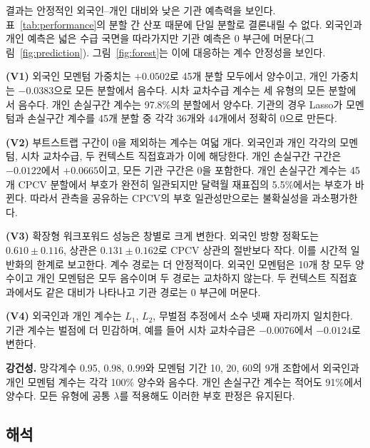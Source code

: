 결과는 안정적인 외국인--개인 대비와 낮은 기관 예측력을 보인다. 표~\ref{tab:performance}의
분할 간 산포 때문에 단일 분할로 결론내릴 수 없다. 외국인과 개인 예측은 넓은 수급
국면을 따라가지만 기관 예측은 0 부근에 머문다(그림~\ref{fig:prediction}).
그림~\ref{fig:forest}는 이에 대응하는 계수 안정성을 보인다.

\textbf{(V1)} 외국인 모멘텀 가중치는 $+0.0502$로 45개 분할 모두에서 양수이고, 개인
가중치는 $-0.0383$으로 모든 분할에서 음수다. 시차 교차수급 계수는 세 유형의 모든
분할에서 음수다. 개인 손실구간 계수는 97.8\%의 분할에서 양수다. 기관의 경우 Lasso가
모멘텀과 손실구간 계수를 45개 분할 중 각각 36개와 44개에서 정확히 0으로 만든다.

\textbf{(V2)} 부트스트랩 구간이 0을 제외하는 계수는 여덟 개다. 외국인과 개인 각각의
모멘텀, 시차 교차수급, 두 컨텍스트 직접효과가 이에 해당한다. 개인 손실구간 구간은
$-0.0122$에서 $+0.0665$이고, 모든 기관 구간은 0을 포함한다. 개인 손실구간 계수는
45개 CPCV 분할에서 부호가 완전히 일관되지만 달력월 재표집의 5.5\%에서는 부호가
바뀐다. 따라서 관측을 공유하는 CPCV의 부호 일관성만으로는 불확실성을 과소평가한다.

\textbf{(V3)} 확장형 워크포워드 성능은 창별로 크게 변한다. 외국인 방향 정확도는
$0.610\pm0.116$, 상관은 $0.131\pm0.162$로 CPCV 상관의 절반보다 작다. 이를 시간적
일반화의 한계로 보고한다. 계수 경로는 더 안정적이다. 외국인 모멘텀은 10개 창 모두
양수이고 개인 모멘텀은 모두 음수이며 두 경로는 교차하지 않는다. 두 컨텍스트
직접효과에서도 같은 대비가 나타나고 기관 경로는 0 부근에 머문다.

\textbf{(V4)} 외국인과 개인 계수는 $L_1$, $L_2$, 무벌점 추정에서 소수 넷째 자리까지
일치한다. 기관 계수는 벌점에 더 민감하며, 예를 들어 시차 교차수급은 $-0.0076$에서
$-0.0124$로 변한다.

\textbf{강건성.} 망각계수 0.95, 0.98, 0.99와 모멘텀 기간 10, 20, 60의 9개 조합에서
외국인과 개인 모멘텀 계수는 각각 100\% 양수와
음수다. 개인 손실구간 계수는 적어도 91\%에서 양수다. 모든 유형에 공통 $\lambda$를
적용해도 이러한 부호 판정은 유지된다.

\FloatBarrier
\subsection{해석}
\label{sec:interpretation}

